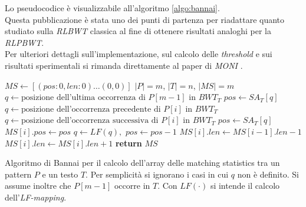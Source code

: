 Lo pseudocodice è visualizzabile all'algoritmo \ref{algo:bannai}.\\
Questa pubblicazione è stata uno dei punti di partenza per
riadattare quanto studiato sulla \textit{RLBWT} classica al fine di ottenere
risultati analoghi per la \textit{RLPBWT}.\\
Per ulteriori dettagli sull'implementazione, sul calcolo delle
\textit{threshold} e sui risultati sperimentali si rimanda direttamente al paper
di \textit{MONI} \cite{moni}.
\begin{algorithm}
  \footnotesize
  \begin{algorithmic}[1]
    \State $MS\gets[(pos : 0, len : 0) \ldots (0, 0)]$
    \Comment $|P| = m$, $|T| = n$, $|MS| = m$
    \State $q\gets\mbox{posizione dell'ultima occorrenza di }P[m-1] \mbox{ in }
    BWT_T$
    \State $pos \gets SA_T[q]$
    \State $q\gets\mbox{posizione dell'occorrenza precedente di }P[i] \mbox{ in
    } BWT_T$
    \Else
    \State $q\gets\mbox{posizione dell'occorrenza successiva di }P[i] \mbox{ in
    } BWT_T$
    \EndIf
    \State $pos\gets SA_T[q]$
    \EndIf
    \State $MS[i].pos \gets pos$
    \State $q\gets LF(q),\,\,pos\gets pos-1$
    \EndFor
    \State $MS[i].len\gets MS[i-1].len-1$
    \State  $MS[i].len\gets MS[i].len+1$
    \EndWhile
    \EndFor
    \State \textbf{return} $MS$
    \EndFunction
  \end{algorithmic}
  \caption{Algoritmo di Bannai per il calcolo dell'array delle matching
  statistics tra un 
  pattern $P$ e un testo $T$. Per
  semplicità si ignorano i casi in cui $q$ non è definito. Si
  assume inoltre che $P[m-1]$ occorre in $T$. Con $LF(\cdot)$ si intende il
  calcolo dell'\textit{LF-mapping}.}
  \label{algo:bannai}
\end{algorithm}
